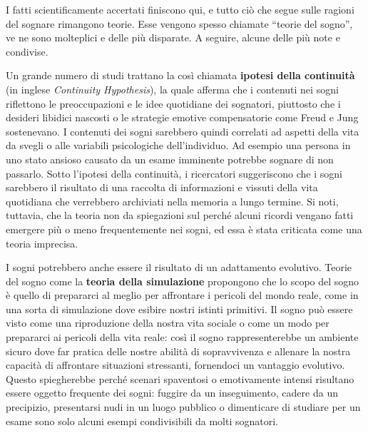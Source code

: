 I fatti scientificamente accertati finiscono qui, e tutto ciò che segue sulle ragioni del sognare rimangono teorie.
Esse vengono spesso chiamate ``teorie del sogno'', ve ne sono molteplici e delle più disparate.
A seguire, alcune delle più note e condivise.


Un grande numero di studi trattano la così chiamata \textbf{ipotesi della continuità} (in inglese
\textit{Continuity Hypothesis}), la quale afferma che i contenuti nei sogni riflettono le preoccupazioni
e le idee quotidiane dei sognatori, piuttosto che i desideri libidici nascosti o le strategie emotive compensatorie
come Freud e Jung sostenevano.
I contenuti dei sogni sarebbero quindi correlati ad aspetti della vita da svegli o alle variabili psicologiche
dell'individuo.
Ad esempio una persona in uno stato ansioso causato da un esame imminente potrebbe sognare di non passarlo.
Sotto l'ipotesi della continuità, i ricercatori suggeriscono che i sogni sarebbero il risultato di una raccolta di
informazioni e vissuti della vita quotidiana che verrebbero archiviati nella memoria a lungo termine.
Si noti, tuttavia, che la teoria non da spiegazioni sul perché alcuni ricordi vengano
fatti emergere più o meno frequentemente nei sogni, ed essa è stata criticata come una teoria imprecisa.


I sogni potrebbero anche essere il risultato di un adattamento evolutivo.
Teorie del sogno come la \textbf{teoria della simulazione} propongono che lo scopo del sogno è quello di prepararci
al meglio per affrontare i pericoli del mondo reale, come in una sorta di simulazione dove esibire nostri istinti
primitivi.
Il sogno può essere visto come una riproduzione della nostra vita sociale o come un modo per prepararci ai pericoli
della vita reale: così il sogno rappresenterebbe un ambiente sicuro dove far pratica delle nostre
abilità di sopravvivenza e allenare la nostra capacità di affrontare situazioni stressanti, fornendoci un vantaggio
evolutivo.
Questo spiegherebbe perché scenari spaventosi o emotivamente intensi risultano essere oggetto frequente dei sogni:
fuggire da un inseguimento, cadere da un precipizio, presentarsi nudi in un luogo pubblico o dimenticare di studiare
per un esame sono solo alcuni esempi condivisibili da molti sognatori.


